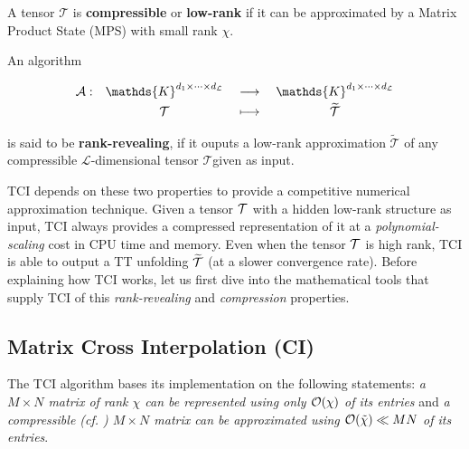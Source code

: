 \begin{definition}
	A tensor $\mathcal{T}$ is {\normalfont \textbf{compressible}} or {\normalfont \textbf{low-rank}} if it can be approximated by a Matrix Product State (MPS) with small rank $\chi$.
	\label{def:compresstensor}
\end{definition}

\begin{definition}
	An algorithm 
	
	\[
		\renewcommand{\arraystretch}{1.1}%
		\begin{array}{r c >{{}}c<{{}} c} 
		\mathcal{A}: &
		\mathds{K}^{d_1 \times \dots \times d_\mathcal{L}} &
		\longrightarrow &
		\mathds{K}^{d_1 \times \dots \times d_\mathcal{L}} \\[2pt]
		& \mathcal{T} &
		\longmapsto &
		\widetilde{\mathcal{T}}
		\end{array}
	\]

	is said to be {\normalfont \textbf{rank-revealing}}, if it ouputs a low-rank approximation $\widetilde{\mathcal{T}}$ of any compressible $\mathcal{L}$-dimensional tensor $\mathcal{T}$\footnotemark given as input.
	\label{def:rkralg}
\end{definition}

TCI depends on these two properties to provide a competitive numerical approximation technique. Given a tensor $\mathcal{T}$ with a hidden low-rank structure as input, TCI always provides a compressed representation of it at a \textit{polynomial-scaling} cost in CPU time and memory. Even when the tensor $\mathcal{T}$ is high rank, TCI is able to output a TT unfolding $\widetilde{\mathcal{T}}$ (at a slower convergence rate). Before explaining how TCI works, let us first dive into the mathematical tools that supply TCI of this \textit{rank-revealing} and \textit{compression} properties.


\subsection{Matrix Cross Interpolation (CI)}
The TCI algorithm bases its implementation on the following statements: \textit{a $M\times N$ matrix of rank $\chi$ can be represented using only $\mathcal{O}(\chi)$ of its entries} and \textit{a compressible (cf. ) $M\times N$ matrix can be approximated using  $\mathcal{O}({\tilde \chi}) \ll MN$ of its entries}.

